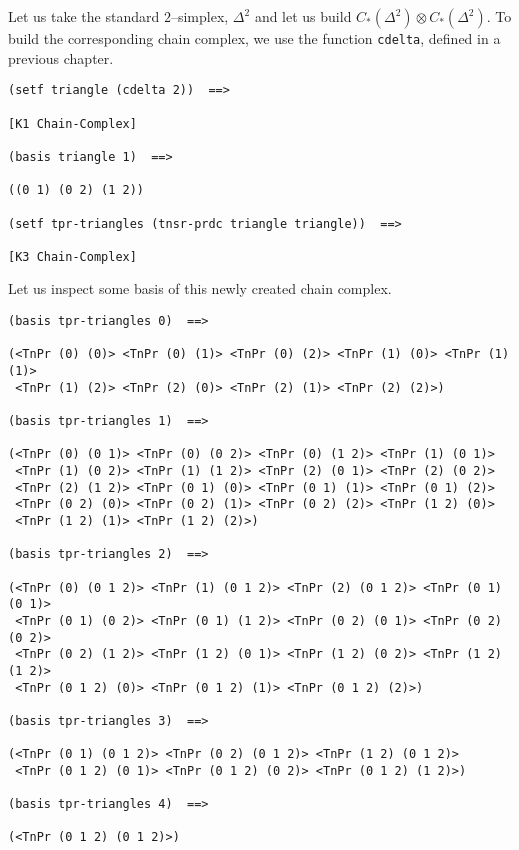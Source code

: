 Let us take the standard $2$--simplex, $\Delta^2$ and let us build $C_*(\Delta^2) \otimes C_*(\Delta^2)$. To build
the corresponding chain complex, we use the function {\tt cdelta}, defined in a previous chapter.
{\footnotesize\begin{verbatim}
(setf triangle (cdelta 2))  ==>

[K1 Chain-Complex]

(basis triangle 1)  ==>

((0 1) (0 2) (1 2))

(setf tpr-triangles (tnsr-prdc triangle triangle))  ==>

[K3 Chain-Complex]
\end{verbatim}}
Let us inspect some basis of this newly created chain complex.
{\footnotesize\begin{verbatim}
(basis tpr-triangles 0)  ==>

(<TnPr (0) (0)> <TnPr (0) (1)> <TnPr (0) (2)> <TnPr (1) (0)> <TnPr (1) (1)> 
 <TnPr (1) (2)> <TnPr (2) (0)> <TnPr (2) (1)> <TnPr (2) (2)>)

(basis tpr-triangles 1)  ==>

(<TnPr (0) (0 1)> <TnPr (0) (0 2)> <TnPr (0) (1 2)> <TnPr (1) (0 1)> 
 <TnPr (1) (0 2)> <TnPr (1) (1 2)> <TnPr (2) (0 1)> <TnPr (2) (0 2)> 
 <TnPr (2) (1 2)> <TnPr (0 1) (0)> <TnPr (0 1) (1)> <TnPr (0 1) (2)> 
 <TnPr (0 2) (0)> <TnPr (0 2) (1)> <TnPr (0 2) (2)> <TnPr (1 2) (0)> 
 <TnPr (1 2) (1)> <TnPr (1 2) (2)>)

(basis tpr-triangles 2)  ==>

(<TnPr (0) (0 1 2)> <TnPr (1) (0 1 2)> <TnPr (2) (0 1 2)> <TnPr (0 1) (0 1)> 
 <TnPr (0 1) (0 2)> <TnPr (0 1) (1 2)> <TnPr (0 2) (0 1)> <TnPr (0 2) (0 2)> 
 <TnPr (0 2) (1 2)> <TnPr (1 2) (0 1)> <TnPr (1 2) (0 2)> <TnPr (1 2) (1 2)> 
 <TnPr (0 1 2) (0)> <TnPr (0 1 2) (1)> <TnPr (0 1 2) (2)>)

(basis tpr-triangles 3)  ==>

(<TnPr (0 1) (0 1 2)> <TnPr (0 2) (0 1 2)> <TnPr (1 2) (0 1 2)> 
 <TnPr (0 1 2) (0 1)> <TnPr (0 1 2) (0 2)> <TnPr (0 1 2) (1 2)>)

(basis tpr-triangles 4)  ==>

(<TnPr (0 1 2) (0 1 2)>)
\end{verbatim}}

